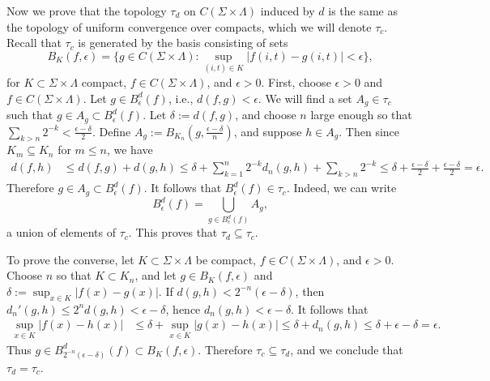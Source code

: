 Now we prove that the topology $\tau_d$ on $C(\Sigma\times\Lambda)$ induced by $d$ is the same as the topology of uniform convergence over compacts, which we will denote $\tau_c$. Recall that $\tau_c$ is generated by the basis consisting of sets
\[
B_K(f,\epsilon) = \Big\{g\in C(\Sigma\times\Lambda) : \sup_{(i,t)\in K} |f(i,t) - g(i,t)| < \epsilon \Big\},
\]
for $K\subset\Sigma\times\Lambda$ compact, $f\in C(\Sigma\times\Lambda)$, and $\epsilon>0$. First, choose $\epsilon>0$ and $f\in C(\Sigma\times\Lambda)$. Let $g\in B^d_\epsilon(f)$, i.e., $d(f,g)<\epsilon$. We will find a set $A_g\in\tau_c$ such that $g\in A_g\subset B^d_\epsilon(f)$. Let $\delta := d(f,g)$, and choose $n$ large enough so that $\sum_{k>n} 2^{-k} < \frac{\epsilon-\delta}{2}$. Define $A_g := B_{K_n}(g,\frac{\epsilon-\delta}{n})$, and suppose $h\in A_g$. Then since $K_m\subseteq K_n$ for $m\leq n$, we have
\begin{align*}
d(f,h) &\leq d(f,g) + d(g,h) \leq \delta + \sum_{k=1}^n 2^{-k}d_n(g,h) + \sum_{k>n} 2^{-k} \leq \delta + \frac{\epsilon-\delta}{2} + \frac{\epsilon-\delta}{2} = \epsilon.
\end{align*}
Therefore $g\in A_g\subset B^d_\epsilon(f)$. It follows that $B^d_\epsilon(f)\in \tau_c$. Indeed, we can write
\[
B^d_\epsilon(f) = \bigcup_{g\in B^d_\epsilon(f)} A_g,
\]
a union of elements of $\tau_c$. This proves that $\tau_d\subseteq\tau_c$.

To prove the converse, let $K\subset\Sigma\times\Lambda$ be compact, $f\in C(\Sigma\times\Lambda)$, and $\epsilon>0$. Choose $n$ so that $K\subset K_n$, and let $g\in B_K(f,\epsilon)$ and $\delta:= \sup_{x\in K} |f(x)-g(x)|$. If $d(g,h) < 2^{-n}(\epsilon-\delta)$, then $d_n'(g,h) \leq 2^n d(g,h) < \epsilon-\delta$, hence $d_n(g,h) < \epsilon-\delta$. It follows that
\begin{align*}
\sup_{x\in K} |f(x)-h(x)| &\leq \delta + \sup_{x\in K} |g(x)-h(x)| \leq \delta + d_n(g,h) \leq \delta + \epsilon-\delta = \epsilon.
\end{align*}
Thus $g\in B^d_{2^{-n}(\epsilon-\delta)}(f) \subset B_K(f,\epsilon)$. Therefore $\tau_c\subseteq \tau_d$, and we conclude that $\tau_d = \tau_c$.

